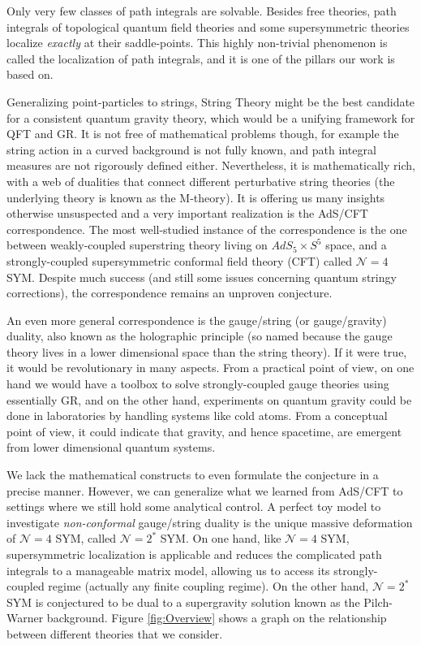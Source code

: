 Only very few classes of path integrals are solvable. 
Besides free theories, path integrals of topological quantum field theories and some supersymmetric theories localize \emph{exactly} 
at their saddle-points. This highly non-trivial phenomenon is called the localization of path integrals, 
and it is one of the pillars our work is based on. 

Generalizing point-particles to strings, 
String Theory might be the best candidate for a consistent quantum gravity theory, 
which would be a unifying framework for QFT and GR. It is not free of mathematical problems though, 
for example the string action in a curved background is not fully known, 
and path integral measures are not rigorously defined either. Nevertheless, it is mathematically rich, 
with a web of dualities that connect different perturbative string theories (the underlying theory is known as the M-theory). 
It is offering us many insights otherwise unsuspected and a very important realization is the AdS/CFT correspondence. 
The most well-studied instance of the correspondence is the one between weakly-coupled superstring theory living on $AdS_5 \times S^5$ space, 
and a strongly-coupled supersymmetric conformal field theory (CFT) called $\mathcal{N}=4$  SYM. 
Despite much success (and still some issues concerning quantum stringy corrections), the correspondence remains an unproven conjecture.

An even more general correspondence is the gauge/string (or gauge/gravity) duality, 
also known as the holographic principle (so named because the gauge theory lives in a lower dimensional space than the string theory). 
If it were true, it would be revolutionary in many aspects. From a practical point of view,
on one hand we would have a toolbox to solve strongly-coupled gauge theories using essentially GR, 
and on the other hand, experiments on quantum gravity could be done in laboratories by handling systems like cold atoms. 
From a conceptual point of view, it could indicate that gravity, and hence spacetime, are emergent from lower dimensional quantum systems.

We lack the mathematical constructs to even formulate the conjecture in a precise manner. 
However, we can generalize what we learned from AdS/CFT to settings where we still hold some analytical control. 
A perfect toy model to investigate \emph{non-conformal} gauge/string duality is the unique massive deformation of $\mathcal{N}=4$ SYM, 
called $\mathcal{N}=2^*$ SYM.
On one hand, like $\mathcal{N}=4$ SYM, supersymmetric localization is applicable 
and reduces the complicated path integrals to a manageable matrix model,
allowing us to access its strongly-coupled regime (actually any finite coupling regime). 
On the other hand, $\mathcal{N}=2^*$ SYM 
is conjectured to be dual to a supergravity solution known as the Pilch-Warner background.
Figure \ref{fig:Overview} shows a graph on the relationship between different theories that we consider.



